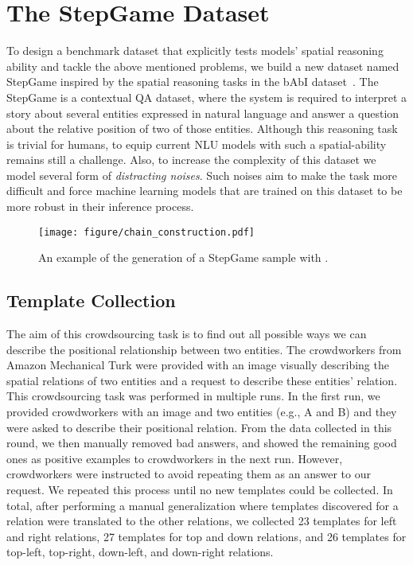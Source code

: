 \documentclass[letterpaper]{article} \usepackage{aaai22}  \usepackage{times}  \usepackage{helvet}  \usepackage{courier}  \usepackage[hyphens]{url}  \usepackage{graphicx} \urlstyle{rm} \def\UrlFont{\rm}  \usepackage{natbib}  \usepackage{caption} \DeclareCaptionStyle{ruled}{labelfont=normalfont,labelsep=colon,strut=off} \frenchspacing  \setlength{\pdfpagewidth}{8.5in}  \setlength{\pdfpageheight}{11in}  \usepackage{algorithm}
\begin{document}
\section{The StepGame Dataset}
To design a benchmark dataset that explicitly tests models' spatial reasoning ability and tackle the above mentioned problems, we build a new dataset named StepGame inspired by the spatial reasoning tasks in the bAbI dataset~\cite{weston2015towards}. The StepGame is a contextual QA dataset, where the system is required to interpret a story about several entities expressed in natural language and answer a question about the relative position of two of those entities. Although this reasoning task is trivial for humans, to equip current NLU models with such a spatial-ability remains still a challenge. 
Also, to increase the complexity of this dataset we model several form of \textit{distracting noises}. Such noises aim to make the task more difficult and force machine learning models that are trained on this dataset to be more robust in their inference process.  
\begin{figure}[!t]
  \centering
  \texttt{[image: figure/chain\_construction.pdf]}
  \caption{An example of the generation of a StepGame sample with .}
  \label{generation_step}
\end{figure}

\subsection{Template Collection}

The aim of this crowdsourcing task is to find out all possible ways we can describe the positional relationship between two entities. 
The crowdworkers from Amazon Mechanical Turk were provided with an image visually describing the spatial relations of two entities and a request to describe these entities' relation. 
This crowdsourcing task was performed in multiple runs. 
In the first run, we provided crowdworkers with an image and two entities (e.g., A and B) and they were asked to describe their positional relation. 
From the data collected in this round, we then manually removed bad answers, and showed the remaining good ones as positive examples to crowdworkers in the next run. However, crowdworkers were instructed to avoid repeating them as an answer to our request. We repeated this process until no new templates could be collected. 
In total, after performing a manual generalization where templates discovered for a relation were translated to the other relations, we collected 23 templates for left and right relations, 27 templates for top and down relations, and 26 templates for top-left, top-right, down-left, and down-right relations. 
\end{document}

